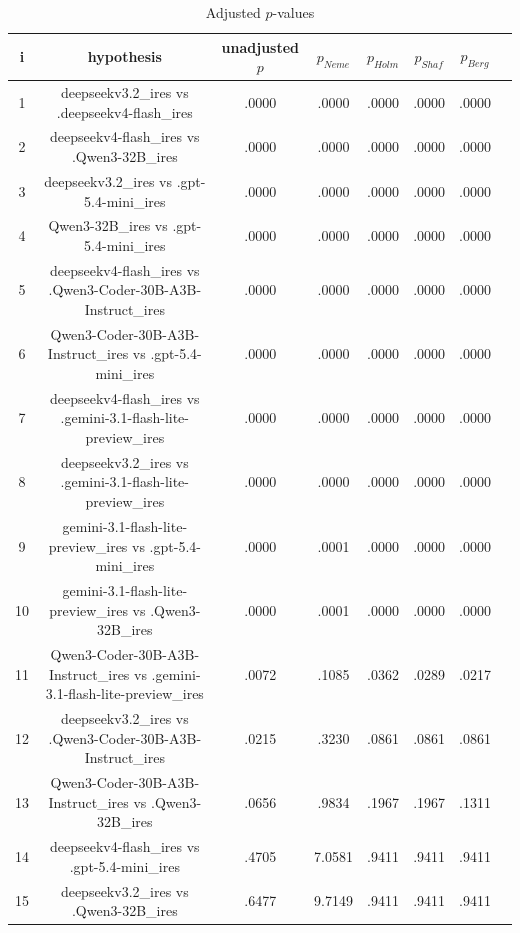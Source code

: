 \documentclass[a4paper,10pt]{article}
\begin{document}
\begin{landscape}
\begin{table}[!htp]
\centering\tiny
\caption{Adjusted $p$-values}
\begin{tabular}{cccccccc}
i&hypothesis&unadjusted $p$&$p_{Neme}$&$p_{Holm}$&$p_{Shaf}$&$p_{Berg}$\\
\hline
1&deepseekv3.2_ires vs .deepseekv4-flash_ires&.0000&.0000&.0000&.0000&.0000\\2&deepseekv4-flash_ires vs .Qwen3-32B_ires&.0000&.0000&.0000&.0000&.0000\\3&deepseekv3.2_ires vs .gpt-5.4-mini_ires&.0000&.0000&.0000&.0000&.0000\\4&Qwen3-32B_ires vs .gpt-5.4-mini_ires&.0000&.0000&.0000&.0000&.0000\\5&deepseekv4-flash_ires vs .Qwen3-Coder-30B-A3B-Instruct_ires&.0000&.0000&.0000&.0000&.0000\\6&Qwen3-Coder-30B-A3B-Instruct_ires vs .gpt-5.4-mini_ires&.0000&.0000&.0000&.0000&.0000\\7&deepseekv4-flash_ires vs .gemini-3.1-flash-lite-preview_ires&.0000&.0000&.0000&.0000&.0000\\8&deepseekv3.2_ires vs .gemini-3.1-flash-lite-preview_ires&.0000&.0000&.0000&.0000&.0000\\9&gemini-3.1-flash-lite-preview_ires vs .gpt-5.4-mini_ires&.0000&.0001&.0000&.0000&.0000\\10&gemini-3.1-flash-lite-preview_ires vs .Qwen3-32B_ires&.0000&.0001&.0000&.0000&.0000\\11&Qwen3-Coder-30B-A3B-Instruct_ires vs .gemini-3.1-flash-lite-preview_ires&.0072&.1085&.0362&.0289&.0217\\12&deepseekv3.2_ires vs .Qwen3-Coder-30B-A3B-Instruct_ires&.0215&.3230&.0861&.0861&.0861\\13&Qwen3-Coder-30B-A3B-Instruct_ires vs .Qwen3-32B_ires&.0656&.9834&.1967&.1967&.1311\\14&deepseekv4-flash_ires vs .gpt-5.4-mini_ires&.4705&7.0581&.9411&.9411&.9411\\15&deepseekv3.2_ires vs .Qwen3-32B_ires&.6477&9.7149&.9411&.9411&.9411\\\hline
\end{tabular}
\end{table}

\end{landscape}
\end{document}
